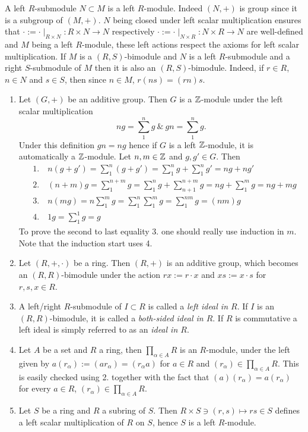 \begin{remark}
    A left $R$-submodule $N\subset M$ is a left $R$-module. Indeed $(N,+)$ is group since it is a subgroup of $(M,+)$. $N$ being closed under left scalar multiplication ensures that $\cdot := \cdot\mid_{R\times N} : R\times N \rightarrow N$ respectively $\cdot := \cdot\mid_{N \times R}: N\times R\rightarrow N$ are well-defined and $M$ being a left $R$-module, these left actions respect the axioms for left scalar multiplication. If $M$ is a $(R,S)$-bimodule and $N$ is a left $R$-submodule and a right $S$-submodule of $M$ then it is also an $(R,S)$-bimodule. Indeed, if $r\in R$, $n\in N$ and $s\in S$, then since $n\in M$, $r(ns)=(rn)s$.
\end{remark}
\begin{example}
    \begin{enumerate}
        \item Let $(G,+)$ be an additive group. Then $G$ is a $\mathbb{Z}$-module under the left scalar multiplication
        $$ng = \sum_1^n g \ \& \ gn = \sum_1^n g.$$
        Under this definition $gn = ng$ hence if $G$ is a left $\mathbb{Z}$-module, it is automatically a $\mathbb{Z}$-module. Let $n,m\in \mathbb{Z}$ and $g,g'\in G$. Then 
        \begin{align*}
            &1. \quad  n(g+g') = \sum_1^n (g+g') = \sum_1^n g + \sum_1^n g' = ng+ng' \\
            &2. \quad (n+m)g = \sum_1^{n+m} g = \sum_1^n g + \sum_{n+1}^{n+m} g = ng + \sum_1^m g = ng +mg \\
            &3. \quad n(mg) = n\sum_1^m g = \sum_1^n\sum_1^m g =  \sum_1^{nm} g = (nm)g\\
            &4. \quad 1g = \sum_1^1 g = g
        \end{align*}
        To prove the second to last equality 3. one should really use induction in $m$. Note that the induction start uses 4.
        \item Let $(R,+,\cdot)$ be a ring. Then $(R,+)$ is an additive group, which becomes an $(R,R)$-bimodule under the action $rx := r\cdot x$ and $xs := x\cdot s$ for $r,s,x\in R$.
        \item A left/right $R$-submodule of $I\subset R$ is called a \textit{left ideal in $R$}. If $I$ is an $(R,R)$-bimodule, it is called a \textit{both-sided ideal in $R$}. If $R$ is commutative a left ideal is simply referred to as an \textit{ideal in $R$}. 
        \item Let $A$ be a set and $R$ a ring, then $\prod_{\alpha \in A} R$ is an $R$-module, under the left given by $a(r_\alpha) := (ar_\alpha)=(r_\alpha a)$ for $a\in R$ and $(r_\alpha)\in \prod_{\alpha \in A} R$. This is easily checked using 2. together with the fact that $(a)(r_\alpha) = a(r_\alpha)$ for every $a\in R$, $(r_\alpha)\in \prod_{\alpha \in A} R$.
        \item Let $S$ be a ring and $R$ a subring of $S$. Then $ R\times S\ni(r,s) \mapsto rs\in S $ defines a left scalar multiplication of $R$ on $S$, hence $S$ is a left $R$-module.
    \end{enumerate}
\end{example}
